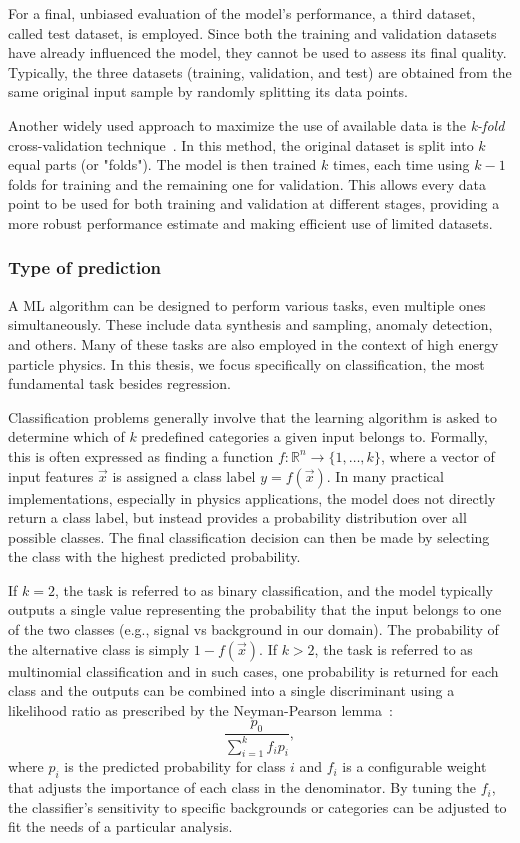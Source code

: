 For a final, unbiased evaluation of the model’s performance, a third dataset, called test dataset, is employed. Since both the training and validation datasets have already influenced the model, they cannot be used to assess its final quality. Typically, the three datasets (training, validation, and test) are obtained from the same original input sample by randomly splitting its data points.

Another widely used approach to maximize the use of available data is the \textit{k-fold} cross-validation technique~\cite{tmvatoolkit}. In this method, the original dataset is split into $k$ equal parts (or "folds"). The model is then trained $k$ times, each time using $k\minus1$ folds for training and the remaining one for validation. This allows every data point to be used for both training and validation at different stages, providing a more robust performance estimate and making efficient use of limited datasets.

\subsubsection*{Type of prediction}
A ML algorithm can be designed to perform various tasks, even multiple ones simultaneously. These include data synthesis and sampling, anomaly detection, and others. Many of these tasks are also employed in the context of high energy particle physics.
In this thesis, we focus specifically on classification, the most fundamental task besides regression.

Classification problems generally involve that the learning algorithm is asked to determine which of $k$ predefined categories a given input belongs to. Formally, this is often expressed as finding a function $f: \mathbb{R}^n \rightarrow \{1, \dots, k\}$, where a vector of input features $\vec{x}$ is assigned a class label $y = f(\vec{x})$. In many practical implementations, especially in physics applications, the model does not directly return a class label, but instead provides a probability distribution over all possible classes. The final classification decision can then be made by selecting the class with the highest predicted probability.

If $k = 2$, the task is referred to as binary classification, and the model typically outputs a single value representing the probability that the input belongs to one of the two classes (e.g., signal vs background in our domain). The probability of the alternative class is simply $1 - f(\vec{x})$. If $k > 2$, the task is referred to as multinomial classification and in such cases, one probability is returned for each class and the outputs can be combined into a single discriminant using a likelihood ratio as prescribed by the Neyman-Pearson lemma~\cite{Neyman:1933wgr}:
\begin{equation}
    \frac{p_0}{\sum_{i=1}^k f_i p_i},
\end{equation}
where $p_i$ is the predicted probability for class $i$ and $f_i$ is a configurable weight that adjusts the importance of each class in the denominator. By tuning the $f_i$, the classifier’s sensitivity to specific backgrounds or categories can be adjusted to fit the needs of a particular analysis.

